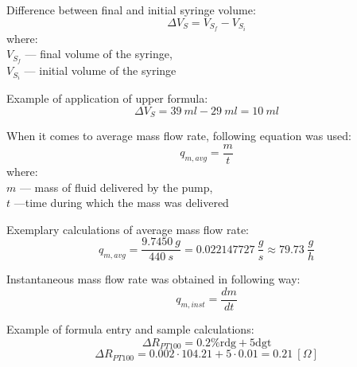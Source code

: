 \documentclass[12pt,a4paper]{article}
\begin{document}
	Difference between final and initial syringe volume:
	\begin{equation}\label{diff_Vs_eq}
		\Delta V_S = V_{S_f} - V_{S_i}
	\end{equation}
	\small
	where: \\
	\indent\indent $V_{S_f}$ — final volume of the syringe,\\
	\indent\indent $V_{S_i}$ — initial volume of the syringe
	\normalsize
	\newline
	
	Example of application of upper formula:
	\begin{equation}\label{diff_Vs_eg_eq}
		\Delta V_S = 39~ml - 29~ml = 10~ml	
	\end{equation}
	
	When it comes to average mass flow rate, following equation was used:
	\begin{equation}\label{qm,avg_eq}
		q_{m,avg} = \frac{m}{t}
	\end{equation}
	\small{
	where: \\
	\indent\indent $m$ — mass of fluid delivered by the pump,\\
	\indent\indent $t$ —time during which the mass was delivered
	}
	\normalsize
	\newline
	
	Exemplary calculations of average mass flow rate:
	\begin{equation}\label{qm,avg_eg_eq}
		q_{m,avg} = \frac{9.7450~g}{440~s} = 0.022147727~\frac{g}{s} \approx 79.73 ~\frac{g}{h}
	\end{equation}
	
	Instantaneous mass flow rate was obtained in following way:
	\begin{equation}\label{qm,inst_eq}
		q_{m,inst} = \frac{dm}{dt}
	\end{equation} 
	
	Example of formula entry and sample calculations:
	\begin{equation} \label{eq:first}
		\Delta R_{PT100} = 0.2\%\text{rdg} + 5\text{dgt}
	\end{equation}
	\begin{equation} \label{eq:second}
		\Delta R_{PT100} = 0.002 \cdot 104.21 + 5 \cdot 0.01 = 0.21~[\Omega]
	\end{equation}
	
\end{document}
